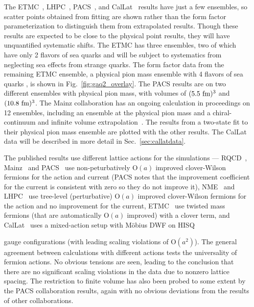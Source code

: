 The ETMC~\cite{Alexandrou:2020okk}, LHPC~\cite{Hasan:2017wwt},
 PACS~\cite{Ishikawa:2018rew,Shintani:2018ozy,Ishikawa:2021eut}, and CalLat~\cite{Meyer:2021vfq}
 results have just a few ensembles, so scatter points obtained from fitting
 are shown rather than the form factor parameterization to distinguish
 them from extrapolated results.
Though these results are expected to be close to the physical point results,
 they will have unquantified systematic shifts.
The ETMC has three ensembles, two of which have only 2 flavors of sea quarks
 and will be subject to systematics from neglecting sea effects from strange quarks.
The form factor data from the remaining ETMC ensemble,
 a physical pion mass ensemble with 4 flavors of sea quarks ,
 is shown in Fig.~\ref{fig:gaq2_overlay}.
The PACS results are on two different ensembles with physical pion mass,
 with volumes of $(5.5~{\rm fm})^3$ and $(10.8~{\rm fm})^3$.
The Mainz collaboration has an ongoing calculation in proceedings on 12 ensembles,
 including an ensemble at the physical pion mass
 and a chiral-continuum and infinite volume extrapolation~\cite{Djukanovic:2021yqg}.
The results from a two-state fit to their physical pion mass ensemble
 are plotted with the other results.
The CalLat data will be described in more detail in Sec.~\ref{sec:callatdata}.

The published results use different lattice actions for the simulations ---
RQCD~\cite{RQCD:2019jai}, Mainz~\cite{Djukanovic:2021yqg} and PACS~\cite{Ishikawa:2018rew,Shintani:2018ozy,Ishikawa:2021eut} use non-peturbatively $\mathrm{O}(a)$ improved clover-Wilson fermions for the action and current (PACS notes that the improvement coefficient for the current is consistent with zero so they do not improve it),
NME~\cite{Park:2021ypf} and LHPC~\cite{Hasan:2017wwt} use tree-level (perturbative) $\mathrm{O}(a)$ improved clover-Wilson fermions for the action and no improvement for the current,
 ETMC~\cite{Alexandrou:2020okk} use twisted mass fermions (that are automatically $\mathrm{O}(a)$ improved) with a clover term,
 and CalLat~\cite{Meyer:2021vfq} uses a mixed-action setup with M\"obius DWF
 on HISQ~\cite{MILC:2012znn}%
 \begin{marginnote}
 \end{marginnote}%
 gauge configurations (with leading scaling violations of $\mathrm{O}(a^2)$).
The general agreement between calculations with different actions tests
 the universality of fermion actions.
No obvious tensions are seen,
 leading to the conclusion that there are no significant scaling violations
 in the data due to nonzero lattice spacing.
The restriction to finite volume has also been probed to some extent by
 the PACS collaboration results, %
 again with no obvious deviations from the results of other collaborations.

